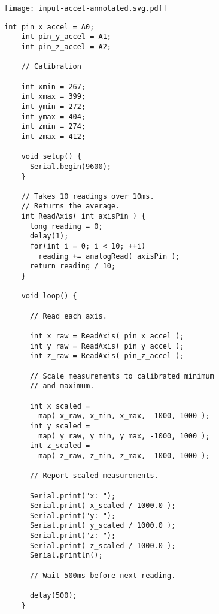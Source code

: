 \vspace{0.1in}
\begin{minipage}[t]{0.49\tw}

  \vspace{0.1in}
  \texttt{[image: input-accel-annotated.svg.pdf]}

\end{minipage}
\hfill
\begin{minipage}[t]{0.49\tw}
  \vspace{0.1in}
  \begin{Verbatim}[gobble=3,fontsize=\small]
    int pin_x_accel = A0;
    int pin_y_accel = A1;
    int pin_z_accel = A2;

    // Calibration

    int xmin = 267;
    int xmax = 399;
    int ymin = 272;
    int ymax = 404;
    int zmin = 274;
    int zmax = 412;

    void setup() {
      Serial.begin(9600);
    }

    // Takes 10 readings over 10ms.
    // Returns the average.
    int ReadAxis( int axisPin ) {
      long reading = 0;
      delay(1);
      for(int i = 0; i < 10; ++i)
        reading += analogRead( axisPin );
      return reading / 10;
    }

    void loop() {

      // Read each axis.

      int x_raw = ReadAxis( pin_x_accel );
      int y_raw = ReadAxis( pin_y_accel );
      int z_raw = ReadAxis( pin_z_accel );

      // Scale measurements to calibrated minimum
      // and maximum.

      int x_scaled =
        map( x_raw, x_min, x_max, -1000, 1000 );
      int y_scaled =
        map( y_raw, y_min, y_max, -1000, 1000 );
      int z_scaled =
        map( z_raw, z_min, z_max, -1000, 1000 );

      // Report scaled measurements.

      Serial.print("x: ");
      Serial.print( x_scaled / 1000.0 );
      Serial.print("y: ");
      Serial.print( y_scaled / 1000.0 );
      Serial.print("z: ");
      Serial.print( z_scaled / 1000.0 );
      Serial.println();

      // Wait 500ms before next reading.

      delay(500);
    }
  \end{Verbatim}
\end{minipage}
\vspace{0.1in}

